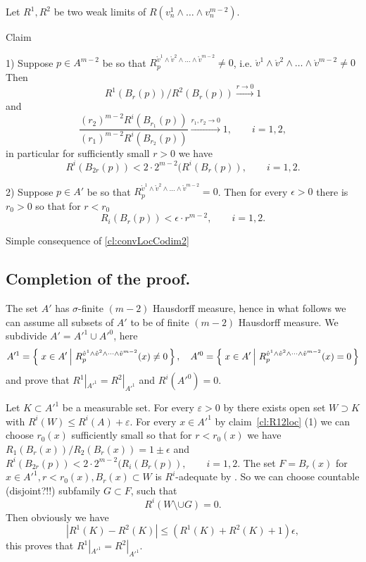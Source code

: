 \documentclass[a4paper,10pt]{article}
\begin{document}
Let $R^1, R^2$ be two weak limits
of  $R(v^1_n\wedge\dots\wedge v^{m-2}_n )$.

\begin{thm}{Claim}\label{cl:R12loc}


1) Suppose $p\in A^{m-2}$ be so that $R_p^{\mathring{v}^1\wedge \mathring{v}^2\wedge\dots\wedge \mathring{v}^{m-2}}\neq 0$, i.e.
$\mathring{v}^1\wedge \mathring{v}^2\wedge\dots\wedge \mathring{v}^{m-2}\neq 0$
Then
$$R^1(B_{r}(p))/R^2(B_{r}(p))\xrightarrow{r\to 0} 1$$
and
$$\frac{(r_2)^{m-2}R^i(B_{r_1}(p))}{(r_1)^{m-2}R^i(B_{r_2}(p))}\xrightarrow{r_1, r_2\to 0} 1, \qquad i=1, 2,$$
in particular for sufficiently small $r>0$
we have
$$ R^i(B_{2r}(p))<2\cdot 2^{m-2}(R^i(B_r(p)),\qquad i=1, 2.$$

2) Suppose $p\in A'$ be so that $R_p^{\mathring{v}^1\wedge \mathring{v}^2\wedge\dots\wedge \mathring{v}^{m-2}}= 0$.
Then for every $\epsilon>0$ there is $r_0>0$ so that
for $r<r_0$
$$ R_i(B_{r}(p))<\epsilon\cdot r^{m-2},\qquad i=1, 2.$$
\end{thm}

 Simple consequence of \ref{cl:convLocCodim2} \qeds

\subsection{Completion of the proof.}
The set $A'$ has $\sigma$-finite $(m-2)$ Hausdorff measure,
hence in what follows we can assume all subsets of $A'$ to
be of finite $(m-2)$ Hausdorff measure.
We subdivide $A'=A'^1\cup A'^0$, here
$$A'^1=\set{x\in A'}{R_p^{\mathring{v}^1\wedge \mathring{v}^2\wedge\dots\wedge
\mathring{v}^{m-2}}(x)\neq 0},
\quad
A'^0=\set{x\in A'}{R_p^{\mathring{v}^1\wedge \mathring{v}^2\wedge\dots\wedge
\mathring{v}^{m-2}}(x)= 0}$$
and prove that
$R^1|_{A'^1}=R^2|_{A'^1}$ and $R^i(A'^0)=0$.

Let $K\subset A'^1$ be a measurable set.
For every $\varepsilon>0$
 by \cite[2.2.2]{federer} there exists open set $W\supset K$ with
$R^i(W)\le R^i(A)+\varepsilon$.
For every $x\in A'^1$  by claim~\ref{cl:R12loc} (1)
   we can choose $r_0(x)$ sufficiently
small
so that for $r<r_0(x)$ we have
$R_1(B_r(x))/R_2(B_r(x))=1\pm \epsilon$ and
$ R^i(B_{2r}(p))<2\cdot 2^{m-2}(R_i(B_r(p)),\qquad i=1, 2$.
The set $F=B_r(x)$ for $x\in A'^1, r<r_0(x), B_r(x)\subset W$ is
$R^i$-adequate by  \cite[2.8.7]{federer}.
So we can choose countable (disjoint?!!) subfamily $G\subset F$, such that
$$R^i(W\setminus\cup G)=0.  $$
Then obviously
we have
$$|R^1(K)-R^2(K)|\le (R^1(K)+R^2(K)+1)\epsilon,$$
this proves that $R^1|_{A'^1}=R^2|_{A'^1}$.
\end{document}
